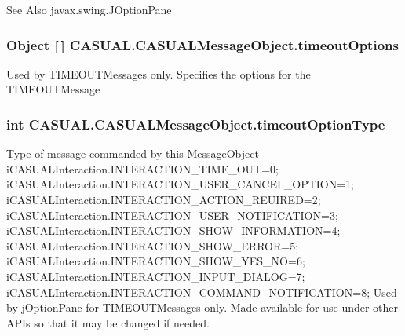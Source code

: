 \begin{DoxySeeAlso}{See Also}
javax.\-swing.\-J\-Option\-Pane 
\end{DoxySeeAlso}
\hypertarget{class_c_a_s_u_a_l_1_1_c_a_s_u_a_l_message_object_aba5217eefa6ca75bb6ccc24f70467d9a}{
\subsubsection[{timeout\-Options}]{\setlength{\rightskip}{0pt plus 5cm}Object \mbox{[}$\,$\mbox{]} C\-A\-S\-U\-A\-L.\-C\-A\-S\-U\-A\-L\-Message\-Object.\-timeout\-Options}}\label{class_c_a_s_u_a_l_1_1_c_a_s_u_a_l_message_object_aba5217eefa6ca75bb6ccc24f70467d9a}
Used by T\-I\-M\-E\-O\-U\-T\-Messages only. Specifies the options for the T\-I\-M\-E\-O\-U\-T\-Message \hypertarget{class_c_a_s_u_a_l_1_1_c_a_s_u_a_l_message_object_af046b1b60b9c4a847bddd8f0a6b112be}{
\subsubsection[{timeout\-Option\-Type}]{\setlength{\rightskip}{0pt plus 5cm}int C\-A\-S\-U\-A\-L.\-C\-A\-S\-U\-A\-L\-Message\-Object.\-timeout\-Option\-Type}}\label{class_c_a_s_u_a_l_1_1_c_a_s_u_a_l_message_object_af046b1b60b9c4a847bddd8f0a6b112be}
Type of message commanded by this Message\-Object i\-C\-A\-S\-U\-A\-L\-Interaction.\-I\-N\-T\-E\-R\-A\-C\-T\-I\-O\-N\-\_\-\-T\-I\-M\-E\-\_\-\-O\-U\-T=0; i\-C\-A\-S\-U\-A\-L\-Interaction.\-I\-N\-T\-E\-R\-A\-C\-T\-I\-O\-N\-\_\-\-U\-S\-E\-R\-\_\-\-C\-A\-N\-C\-E\-L\-\_\-\-O\-P\-T\-I\-O\-N=1; i\-C\-A\-S\-U\-A\-L\-Interaction.\-I\-N\-T\-E\-R\-A\-C\-T\-I\-O\-N\-\_\-\-A\-C\-T\-I\-O\-N\-\_\-\-R\-E\-U\-I\-R\-E\-D=2; i\-C\-A\-S\-U\-A\-L\-Interaction.\-I\-N\-T\-E\-R\-A\-C\-T\-I\-O\-N\-\_\-\-U\-S\-E\-R\-\_\-\-N\-O\-T\-I\-F\-I\-C\-A\-T\-I\-O\-N=3; i\-C\-A\-S\-U\-A\-L\-Interaction.\-I\-N\-T\-E\-R\-A\-C\-T\-I\-O\-N\-\_\-\-S\-H\-O\-W\-\_\-\-I\-N\-F\-O\-R\-M\-A\-T\-I\-O\-N=4; i\-C\-A\-S\-U\-A\-L\-Interaction.\-I\-N\-T\-E\-R\-A\-C\-T\-I\-O\-N\-\_\-\-S\-H\-O\-W\-\_\-\-E\-R\-R\-O\-R=5; i\-C\-A\-S\-U\-A\-L\-Interaction.\-I\-N\-T\-E\-R\-A\-C\-T\-I\-O\-N\-\_\-\-S\-H\-O\-W\-\_\-\-Y\-E\-S\-\_\-\-N\-O=6; i\-C\-A\-S\-U\-A\-L\-Interaction.\-I\-N\-T\-E\-R\-A\-C\-T\-I\-O\-N\-\_\-\-I\-N\-P\-U\-T\-\_\-\-D\-I\-A\-L\-O\-G=7; i\-C\-A\-S\-U\-A\-L\-Interaction.\-I\-N\-T\-E\-R\-A\-C\-T\-I\-O\-N\-\_\-\-C\-O\-M\-M\-A\-N\-D\-\_\-\-N\-O\-T\-I\-F\-I\-C\-A\-T\-I\-O\-N=8; Used by j\-Option\-Pane for T\-I\-M\-E\-O\-U\-T\-Messages only. Made available for use under other A\-P\-Is so that it may be changed if needed.


